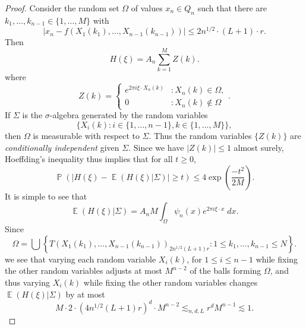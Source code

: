 \documentclass[dvipsnames,letterpaper,12pt]{article}
\numberwithin{equation}{section}
\numberwithin{theorem}{section}
\DeclareMathOperator{\EE}{\mathbb{E}}
\DeclareMathOperator{\PP}{\mathbb{P}}
\begin{document}
\begin{proof}
    Consider the random set $\Omega$ of values $x_n \in Q_n$ such that there are $k_1,\dots,k_{n-1} \in \{ 1,\dots,M \}$ with
    \begin{equation}
        |x_n - f(X_1(k_1),\dots,X_{n-1}(k_{n-1}))| \leq 2 n^{1/2} \cdot (L+1) \cdot r.
    \end{equation}
    Then
    \begin{equation}
        H(\xi) = A_n \sum_{k = 1}^M Z(k).
    \end{equation}
    where
    \[ Z(k) = \begin{cases} e^{2 \pi i \xi \cdot X_n(k)} &: X_n(k) \in \Omega, \\ 0 &: X_n(k) \not \in \Omega \end{cases}. \]
    If $\Sigma$ is the $\sigma$-algebra generated by the random variables
    \[ \{ X_i(k) : i \in \{ 1, \dots, n-1 \}, k \in \{ 1, \dots, M \} \}, \]
    then $\Omega$ is measurable with respect to $\Sigma$. Thus the random variables $\{ Z(k) \}$ are \emph{conditionally independent} given $\Sigma$. Since we have $|Z(k)| \leq 1$ almost surely, Hoeffding's inequality thus implies that for all $t \geq 0$,
    \begin{equation} \label{equationCOIJCOIJX1232312}
        \PP \left( \left| H(\xi) - \EE(H(\xi)|\Sigma) \right| \geq t \right) \leq 4 \exp \left( \frac{-t^2}{2M} \right).
    \end{equation}
    It is simple to see that
    \begin{equation}
        \EE(H(\xi) | \Sigma) = A_n M \int_\Omega \psi_n(x) e^{2 \pi i \xi \cdot x}\; dx.
    \end{equation}
    Since
    \begin{equation}
        \Omega = \bigcup \left\{ T(X_1(k_1),\dots,X_{n-1}(k_{n-1}))_{2 n^{1/2} (L+1) r} : 1 \leq k_1,\dots,k_{n-1} \leq N \right\}.
    \end{equation}
    we see that varying each random variable $X_i(k)$, for $1 \leq i \leq n-1$ while fixing the other random variables adjusts at most $M^{n-2}$ of the balls forming $\Omega$, and thus varying $X_i(k)$ while fixing the other random variables changes $\EE(H(\xi)|\Sigma)$ by at most
    \begin{equation}
        M \cdot 2 \cdot (4n^{1/2} (L+1) r)^d \cdot M^{n-2} \lesssim_{n,d,L} r^d M^{n-1} \lesssim 1.
    \end{equation}

\end{proof}
\end{document}
